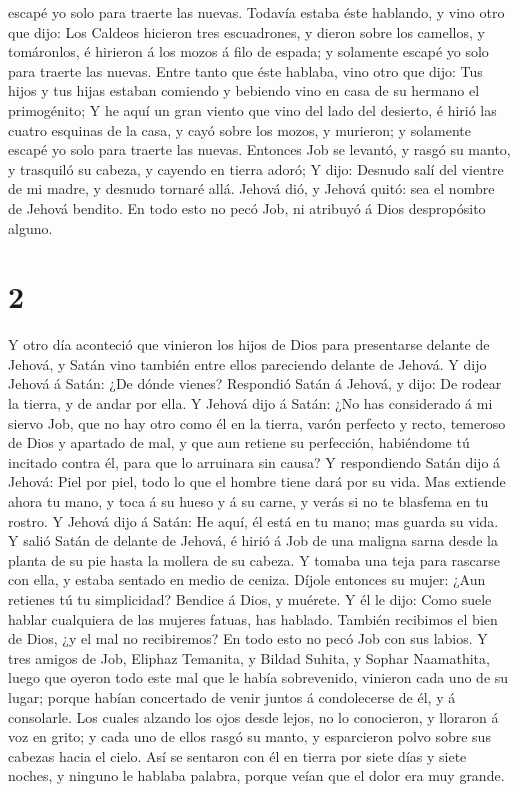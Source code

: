escapé yo solo para traerte las nuevas.  Todavía estaba
éste hablando, y vino otro que dijo: Los Caldeos hicieron tres
escuadrones, y dieron sobre los camellos, y tomáronlos, é hirieron á los
mozos á filo de espada; y solamente escapé yo solo para traerte las
nuevas.  Entre tanto que éste hablaba, vino otro que
dijo: Tus hijos y tus hijas estaban comiendo y bebiendo vino en casa de
su hermano el primogénito;  Y he aquí un gran viento que
vino del lado del desierto, é hirió las cuatro esquinas de la casa, y
cayó sobre los mozos, y murieron; y solamente escapé yo solo para
traerte las nuevas.  Entonces Job se levantó, y rasgó su
manto, y trasquiló su cabeza, y cayendo en tierra adoró; 
Y dijo: Desnudo salí del vientre de mi madre, y desnudo tornaré allá.
Jehová dió, y Jehová quitó: sea el nombre de Jehová bendito.
 En todo esto no pecó Job, ni atribuyó á Dios
despropósito alguno.

\hypertarget{section-1}{%
\section{2}\label{section-1}}

 Y otro día aconteció que vinieron los hijos de Dios para
presentarse delante de Jehová, y Satán vino también entre ellos
pareciendo delante de Jehová.  Y dijo Jehová á Satán: ¿De
dónde vienes? Respondió Satán á Jehová, y dijo: De rodear la tierra, y
de andar por ella.  Y Jehová dijo á Satán: ¿No has
considerado á mi siervo Job, que no hay otro como él en la tierra, varón
perfecto y recto, temeroso de Dios y apartado de mal, y que aun retiene
su perfección, habiéndome tú incitado contra él, para que lo arruinara
sin causa?  Y respondiendo Satán dijo á Jehová: Piel por
piel, todo lo que el hombre tiene dará por su vida.  Mas
extiende ahora tu mano, y toca á su hueso y á su carne, y verás si no te
blasfema en tu rostro.  Y Jehová dijo á Satán: He aquí, él
está en tu mano; mas guarda su vida.  Y salió Satán de
delante de Jehová, é hirió á Job de una maligna sarna desde la planta de
su pie hasta la mollera de su cabeza.  Y tomaba una teja
para rascarse con ella, y estaba sentado en medio de ceniza.
 Díjole entonces su mujer: ¿Aun retienes tú tu
simplicidad? Bendice á Dios, y muérete.  Y él le dijo:
Como suele hablar cualquiera de las mujeres fatuas, has hablado. También
recibimos el bien de Dios, ¿y el mal no recibiremos? En todo esto no
pecó Job con sus labios.  Y tres amigos de Job, Eliphaz
Temanita, y Bildad Suhita, y Sophar Naamathita, luego que oyeron todo
este mal que le había sobrevenido, vinieron cada uno de su lugar; porque
habían concertado de venir juntos á condolecerse de él, y á consolarle.
 Los cuales alzando los ojos desde lejos, no lo
conocieron, y lloraron á voz en grito; y cada uno de ellos rasgó su
manto, y esparcieron polvo sobre sus cabezas hacia el cielo.
 Así se sentaron con él en tierra por siete días y siete
noches, y ninguno le hablaba palabra, porque veían que el dolor era muy
grande.

